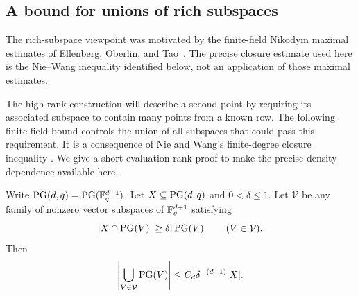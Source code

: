\subsection{A bound for unions of rich subspaces}

The rich-subspace viewpoint was motivated by the finite-field
Nikodym maximal estimates of Ellenberg, Oberlin, and
Tao~\cite[Section~4.4, Theorem~4.6]{EOT}.
The precise closure estimate used here is the Nie--Wang inequality
identified below, not an application of those maximal estimates.

The high-rank construction will describe a second point by requiring
its associated subspace to contain many points from a known row.
The following finite-field bound controls the union of all subspaces
that could pass this requirement. It is a consequence of Nie and
Wang's finite-degree closure inequality
\cite[Theorems~4.1 and~5.6]{NieWang2015}. We give a short evaluation-rank
proof to make the precise density dependence available here.

\begin{lemma}\label{comp:rich-union}
Write \(\operatorname{PG}(d,q)=\operatorname{PG}(\mathbb F_q^{d+1})\).
Let \(X\subseteq\operatorname{PG}(d,q)\) and \(0<\delta\le1\). Let \(\mathcal V\)
be any family of nonzero vector subspaces of \(\mathbb F_q^{d+1}\) satisfying
\[
 |X\cap\operatorname{PG}(V)|\ge\delta|\operatorname{PG}(V)|\qquad(V\in\mathcal V).
\]
Then
\[
 \left|\bigcup_{V\in\mathcal V}\operatorname{PG}(V)\right|
       \le C_d\delta^{-(d+1)}|X|.
\]
\end{lemma}

